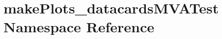 \hypertarget{namespacemakePlots__datacardsMVATest}{
\section{makePlots\_\-datacardsMVATest Namespace Reference}
\label{namespacemakePlots__datacardsMVATest}
}
